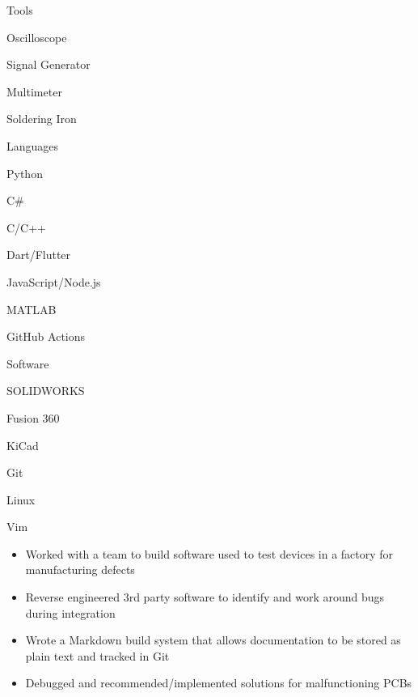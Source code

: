 \documentclass{resume}
\author{Jasper Chan}
\begin{document}
\maketitle

\vspace{-1em} %
\TechnicalSkills

\begin{TechSkills}{Tools}
    \item Oscilloscope
    \item Signal Generator
    \item Multimeter
    \item Soldering Iron
\end{TechSkills}
\begin{TechSkills}{Languages}
    \item Python
    \item C\#
    \item C/C++
    \item Dart/Flutter
    \item JavaScript/Node.js
    \item MATLAB
    \item GitHub Actions
\end{TechSkills}
\begin{TechSkills}{Software}
    \item SOLIDWORKS
    \item Fusion 360
    \item KiCad
    \item Git
    \item Linux
    \item Vim
\end{TechSkills}

\WorkExperience

\begin{itemize}
    \item Worked with a team to build software used to test devices in a factory for manufacturing defects
    \item Reverse engineered 3rd party software to identify and work around bugs during integration
    \item Wrote a Markdown build system that allows documentation to be stored as plain text and tracked in Git
    \item Debugged and recommended/implemented solutions for malfunctioning PCBs
\end{itemize}
\end{document}
